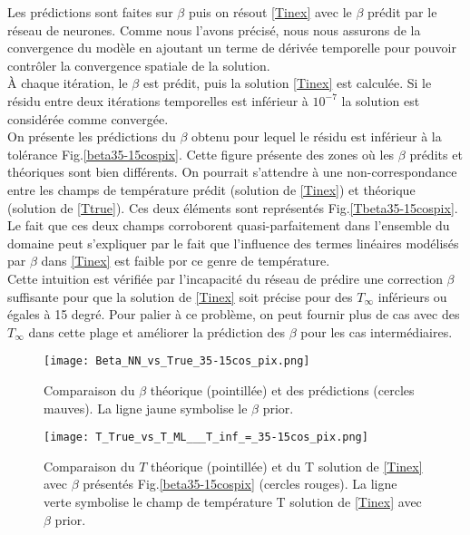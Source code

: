 \documentclass[a4paper,12pt]{article}
\newcommand{\tinf}{$T_\infty$}
\numberwithin{equation}{section} %
\begin{document}
\noindent Les prédictions sont faites sur $\beta$ puis on résout \eqref{Tinex} avec le $\beta$ prédit par le réseau de neurones. Comme nous l'avons précisé, nous nous assurons de la convergence du modèle en ajoutant un terme de dérivée temporelle pour pouvoir contrôler la convergence spatiale de la solution. \\
À chaque itération, le $\beta$ est prédit, puis la solution \eqref{Tinex} est calculée. Si le résidu entre deux itérations temporelles est inférieur à $10^{-7}$ la solution est considérée comme convergée.\\

\noindent On présente les prédictions du $\beta$ obtenu pour lequel le résidu est inférieur à la tolérance Fig.\eqref{beta35-15cospix}. Cette figure présente des zones où les $\beta$ prédits et théoriques sont bien différents. On pourrait s'attendre à une non-correspondance entre les champs de température prédit (solution de \eqref{Tinex}) et théorique (solution de \eqref{Ttrue}). Ces deux éléments sont représentés Fig.\eqref{Tbeta35-15cospix}.\\
Le fait que ces deux champs corroborent quasi-parfaitement dans l'ensemble du domaine peut s'expliquer par le fait que l'influence des termes linéaires modélisés par $\beta$ dans \eqref{Tinex} est faible por ce genre de température.\\
Cette intuition est vérifiée par l'incapacité du réseau de prédire une correction $\beta$ suffisante pour que la solution de \eqref{Tinex} soit précise pour des \tinf $ $  inférieurs ou égales à 15 degré. Pour palier à ce problème, on peut fournir plus de cas avec des \tinf $ $ dans cette plage et améliorer la prédiction des $\beta$ pour les cas intermédiaires.\\
\vspace{-0.3cm}
\begin{figure}[!ht]
\centering
\texttt{[image: Beta\_NN\_vs\_True\_35-15cos\_pix.png]}
\vspace{-3mm}
\caption{\small{Comparaison du $\beta$ théorique (pointillée) et des prédictions (cercles mauves). La ligne jaune symbolise le $\beta$ prior.}}
\label{beta35-15cospix}
\end{figure}

\begin{figure}[!ht]
\centering
\texttt{[image: T\_True\_vs\_T\_ML\_\_\_T\_inf\_=\_35-15cos\_pix.png]}
\vspace{-3mm}
\caption{\small{Comparaison du $T$ théorique (pointillée) et du T solution de \eqref{Tinex} avec $\beta$ présentés Fig.\eqref{beta35-15cospix} (cercles rouges). La ligne verte symbolise le champ de température T solution de \eqref{Tinex} avec $\beta$ prior.}}
\label{Tbeta35-15cospix}
\end{figure}
\end{document}
